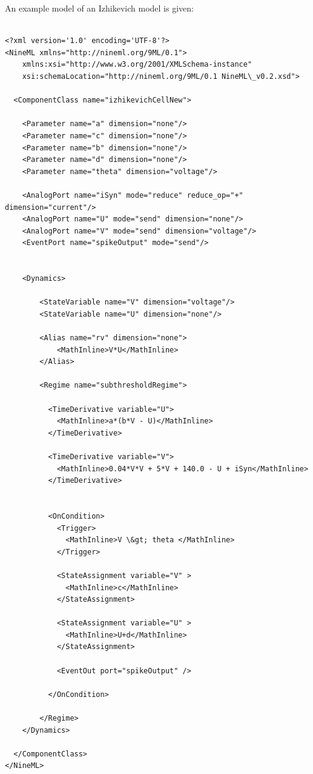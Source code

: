 \documentclass{article}
\begin{document}
An example model of an Izhikevich model is given:
%
\begin{lstlisting}

<?xml version='1.0' encoding='UTF-8'?>
<NineML xmlns="http://nineml.org/9ML/0.1">
    xmlns:xsi="http://www.w3.org/2001/XMLSchema-instance"
    xsi:schemaLocation="http://nineml.org/9ML/0.1 NineML\_v0.2.xsd">

  <ComponentClass name="izhikevichCellNew">

    <Parameter name="a" dimension="none"/>
    <Parameter name="c" dimension="none"/>
    <Parameter name="b" dimension="none"/>
    <Parameter name="d" dimension="none"/>
    <Parameter name="theta" dimension="voltage"/>

    <AnalogPort name="iSyn" mode="reduce" reduce_op="+" dimension="current"/>
    <AnalogPort name="U" mode="send" dimension="none"/>
    <AnalogPort name="V" mode="send" dimension="voltage"/>
    <EventPort name="spikeOutput" mode="send"/>


    <Dynamics>

        <StateVariable name="V" dimension="voltage"/>
        <StateVariable name="U" dimension="none"/>

        <Alias name="rv" dimension="none">
            <MathInline>V*U</MathInline>
        </Alias>

        <Regime name="subthresholdRegime">

          <TimeDerivative variable="U">
            <MathInline>a*(b*V - U)</MathInline>
          </TimeDerivative>

          <TimeDerivative variable="V">
            <MathInline>0.04*V*V + 5*V + 140.0 - U + iSyn</MathInline>
          </TimeDerivative>


          <OnCondition>
            <Trigger>
              <MathInline>V \&gt; theta </MathInline>
            </Trigger>

            <StateAssignment variable="V" >
              <MathInline>c</MathInline>
            </StateAssignment>

            <StateAssignment variable="U" >
              <MathInline>U+d</MathInline>
            </StateAssignment>

            <EventOut port="spikeOutput" />

          </OnCondition>

        </Regime>
    </Dynamics>

  </ComponentClass>
</NineML>
\end{lstlisting}
\end{document}
